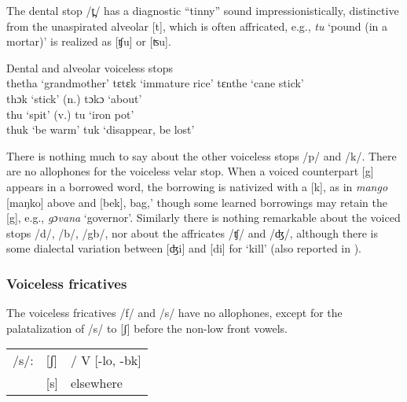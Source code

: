 \label{sec:2.1.2.3.1}
The dental stop /t̪/ has a diagnostic “tinny” sound impressionistically, distinctive from the unaspirated alveolar [t], which is often affricated, e.g., \textit{tu} ‘pound (in a mortar)' is realized as [ʧu] or [ʦu].

\TabPositions{1.25cm,3.75cm,4.75cm,6.75cm,7.75cm,8cm,9cm}
\ea %
\label{ex:19}
Dental and alveolar voiceless stops\\
\vspace{6pt}
thetha \tab ‘grandmother' \tab tɛtɛk \tab ‘immature rice' \tab tɛnthe \tab ‘cane stick'\\
thɔk \tab ‘stick' (n.) \tab tɔkɔ \tab ‘about'\\
thu \tab ‘spit' (v.) \tab tu \tab ‘iron pot'\\
thuk \tab ‘be warm' \tab tuk \tab ‘disappear, be lost'\\
\z

\label{sec:2.1.2.3.2}
There is nothing much to say about the other voiceless stops /p/ and /k/. There are no allophones for the voiceless velar stop. When a voiced counterpart [g] appears in a borrowed word, the borrowing is nativized with a [k], as in \textit{mango} [maŋko] above and [bek]‚ bag,' though some learned borrowings may retain the [g], e.g., \textit{gɔvana} ‘governor'. Similarly there is nothing remarkable about the voiced stops /d/, /b/, /gb/, nor about the affricates /ʧ/ and /ʤ/, although there is some dialectal variation between [ʤi] and [di] for ‘kill' (also reported in \citealt{Pichl1967}).

\subsubsection{Voiceless fricatives}
\label{sec:2.1.2.4}

The voiceless fricatives /f/ and /s/ have no allophones, except for the palatalization of /s/ to [ʃ] before the non-low front vowels.

\ea%
\label{ex:20}
\begin{tabular}[t]{lll}
/s/: &  [ʃ] & / {\longrule} V [-lo, -bk]\\
& [s] & elsewhere\\
\end{tabular}

\vspace{6pt}

